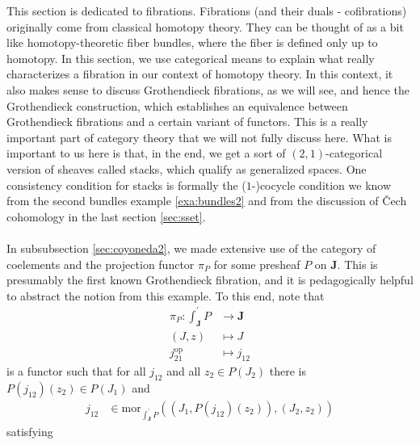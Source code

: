 This section is dedicated to fibrations.
Fibrations (and their duals - cofibrations) originally come from classical homotopy theory.
They can be thought of as a bit like homotopy-theoretic fiber bundles, where the fiber is defined only up to homotopy.
In this section, we use categorical means to explain what really characterizes a fibration in our context of homotopy theory.
In this context, it also makes sense to discuss Grothendieck fibrations, as we will see, and hence the Grothendieck construction, which establishes an equivalence between Grothendieck fibrations and a certain variant of functors.
This is a really important part of category theory that we will not fully discuss here.
What is important to us here is that, in the end, we get a sort of $(2,1)$-categorical version of sheaves called stacks, which qualify as generalized spaces.
One consistency condition for stacks is formally the ($1$-)cocycle condition we know from the second bundles example \ref{exa:bundles2} and from the discussion of \v{C}ech cohomology in the last section \ref{sec:sset}.
\\\\
In subsubsection \ref{sec:coyoneda2}, we made extensive use of the category of coelements and the projection functor $\pi_{P}$ for some presheaf $P$ on $\mathbf{J}$.
This is presumably the first known Grothendieck fibration, and it is pedagogically helpful to abstract the notion from this example.
To this end, note that
\begin{align*}
  \pi_{P}
  \colon
  \int_{\mathbf{J}}^{\prime}
  P
  &\rightarrow
  \mathbf{J}
  \\
  (J,z)
  &\mapsto
  J
  \\
  j_{21}^{\mathrm{op}}
  &\mapsto
  j_{12}
\end{align*}
is a functor such that for all $j_{12}$ and all $z_{2} \in P(J_{2})$ there is $P(j_{12})(z_{2}) \in P(J_{1})$ and
\begin{align*}
  j_{12}
  &\in
  \mathrm{mor}_{\int_{\mathbf{J}}^{\prime}P}
  \left(
    \left(
      J_{1},
      P(j_{12})(z_{2})
    \right),
    (J_{2},z_{2})
  \right)
\end{align*}
satisfying
